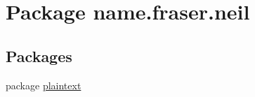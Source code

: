 \hypertarget{namespacename_1_1fraser_1_1neil}{}\section{Package name.\+fraser.\+neil}
\label{namespacename_1_1fraser_1_1neil}
\subsection*{Packages}
\begin{DoxyCompactItemize}
\item 
package \hyperlink{namespacename_1_1fraser_1_1neil_1_1plaintext}{plaintext}
\end{DoxyCompactItemize}
